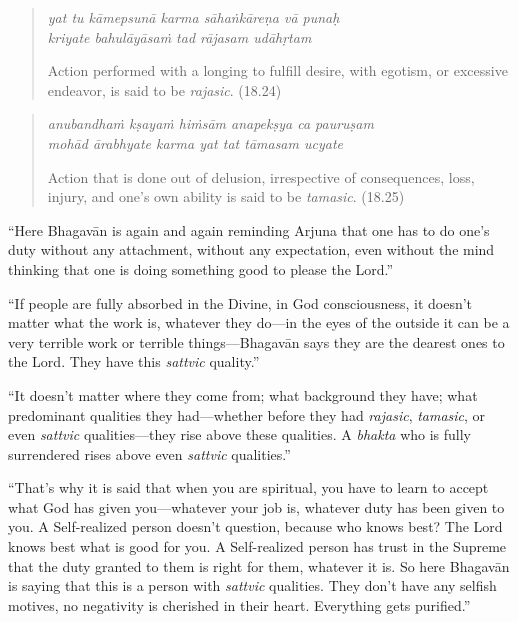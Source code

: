 \documentclass[12pt, twoside, openright]{memoir}
\begin{document}
\par
\begin{verse}
\textit{yat tu kāmepsunā karma sāhaṅkāreṇa vā punaḥ} \\
\textit{kriyate bahulāyāsaṁ tad rājasam udāhṛtam}

\noindent Action performed with a longing to fulfill desire, with egotism, or excessive endeavor, is said to be \textit{rajasic}. (18.24)
\end{verse}
\par



\par
\begin{verse}
\textit{anubandhaṁ kṣayaṁ hiṁsām anapekṣya ca pauruṣam} \\
\textit{mohād ārabhyate karma yat tat tāmasam ucyate}

\noindent Action that is done out of delusion, irrespective of consequences, loss, injury, and one's own ability is said to be \textit{tamasic}. (18.25)
\end{verse}
\par


\enquote{Here Bhagavān is again and again reminding Arjuna that one has to do one’s duty without any attachment, without any expectation, even without the mind thinking that one is doing something good to please the Lord.}

\enquote{If people are fully absorbed in the Divine, in God consciousness, it doesn’t matter what the work is, whatever they do---in the eyes of the outside it can be a very terrible work or terrible things---Bhagavān says they are the dearest ones to the Lord. They have this \textit{sattvic} quality.}

\enquote{It doesn’t matter where they come from; what background they have; what predominant qualities they had---whether before they had \textit{rajasic}, \textit{tamasic}, or even \textit{sattvic} qualities---they rise above these qualities. A \textit{bhakta} who is fully surrendered rises above even \textit{sattvic} qualities.}

\enquote{That’s why it is said that when you are spiritual, you have to learn to accept what God has given you---whatever your job is, whatever duty has been given to you. A Self-realized person doesn’t question, because who knows best? The Lord knows best what is good for you. A Self-realized person has trust in the Supreme that the duty granted to them is right for them, whatever it is. So here Bhagavān is saying that this is a person with \textit{sattvic} qualities. They don’t have any selfish motives, no negativity is cherished in their heart. Everything gets purified.}
\end{document}
